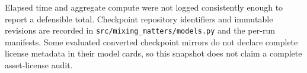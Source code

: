 \documentclass{article}
\begin{document}
Elapsed time and aggregate compute were not logged consistently enough to report a defensible total.
Checkpoint repository identifiers and immutable revisions are recorded in \texttt{src/mixing\_matters/models.py} and the per-run manifests.
Some evaluated converted checkpoint mirrors do not declare complete license metadata in their model cards, so this snapshot does not claim a complete asset-license audit.

\newpage

\end{document}

